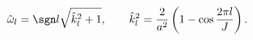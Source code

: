 \begin{equation}
  \hat{\omega}_l=\sgn l\sqrt{\hat{k}_l^2+1},\qquad
  \hat{k}^2_l=\frac{2}{a^2}\left(1-\cos\frac{2\pi l}{J}\right).
\end{equation}


